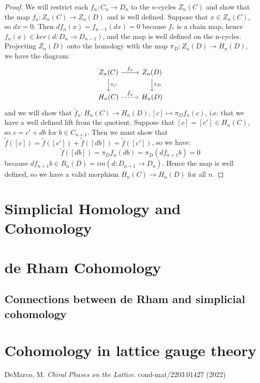 \documentclass[12pt, oneside]{article}   	%
\theoremstyle{definition}
\begin{document}
\begin{proof}
	We will restrict each $f_n : C_n\rightarrow D_n$ to the $n$-cycles $Z_n(C)$ and show that the map $f_n : Z_n(C)
	\rightarrow Z_n(D)$ and is well defined. Suppose that $x\in Z_n(C)$, so $dx = 0$. Then $df_n(x) = f_{n - 1}(dx) = 0$ 
	because $f_*$ is a chain map, hence $f_n(x)\in ker (d : D_n\rightarrow D_{n - 1})$, and the map is well defined on the 
	n-cycles. Projecting $Z_n(D)$ onto the homology with the map $\pi_D : Z_n(D)\rightarrow H_n(D)$, we have the 
	diagram:
	\begin{equation}\begin{tikzcd}
		Z_n(C)\arrow[d, "\pi_C"]\arrow[r, "f_n"] & Z_n(D)\arrow[d, "\pi_D"] \\
		H_n(C)\arrow[r, dashed, "\tilde f_n"] & H_n(D)
	\end{tikzcd}\end{equation}
	and we will show that $\tilde f_n : H_n(C)\rightarrow H_n(D), [c]\mapsto \pi_D f_n(c)$, i.e. that we have a well defined 
	lift from the quotient. Suppose that $[c] = [c']\in H_n(C)$, so $c = c' + db$ for $b\in C_{n + 1}$. Then we must show that 
	$\tilde f([c]) = \tilde f([c']) + \tilde f([db]) = \tilde f([c'])$, so we have:
	\begin{equation}
		\tilde f([db]) = \pi_D f_n(db) = \pi_D (d f_{n + 1}b) = 0
	\end{equation}
	because $df_{n + 1} b\in B_n(D) = im(d : D_{n + 1}\rightarrow D_n)$. Hence the map is well defined, so we have a 
	valid morphism $H_n(C)\rightarrow H_n(D)$ for all $n$. 
\end{proof}

\section{Simplicial Homology and Cohomology}

\section{de Rham Cohomology}

\subsection{Connections between de Rham and simplicial cohomology}

\section{Cohomology in lattice gauge theory}

\newpage
\begin{thebibliography}{99}

DeMarco, M. \textit{Chiral Phases on the Lattice}. cond-mat/2203.01427 (2022)

\end{thebibliography}
\end{document}
